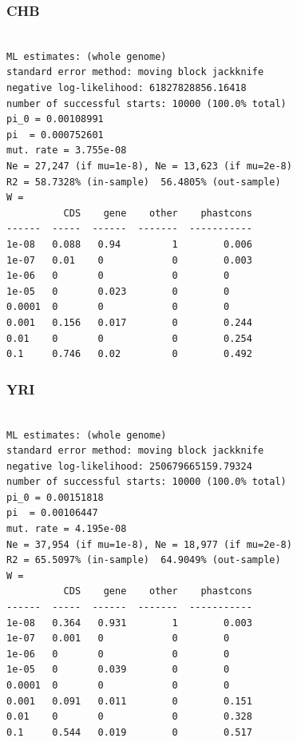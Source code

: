 \documentclass[11pt]{article}
\begin{document}
\subsubsection*{CHB}
\begin{minipage}{\linewidth}\begin{footnotesize}
\begin{verbatim}

ML estimates: (whole genome)
standard error method: moving block jackknife
negative log-likelihood: 61827828856.16418
number of successful starts: 10000 (100.0% total)
pi_0 = 0.00108991
pi  = 0.000752601
mut. rate = 3.755e-08 
Ne = 27,247 (if mu=1e-8), Ne = 13,623 (if mu=2e-8)
R2 = 58.7328% (in-sample)  56.4805% (out-sample)
W = 
          CDS    gene    other    phastcons
------  -----  ------  -------  -----------
1e-08   0.088   0.94         1        0.006
1e-07   0.01    0            0        0.003
1e-06   0       0            0        0
1e-05   0       0.023        0        0
0.0001  0       0            0        0
0.001   0.156   0.017        0        0.244
0.01    0       0            0        0.254
0.1     0.746   0.02         0        0.492
\end{verbatim}
\end{footnotesize}\end{minipage}


\subsubsection*{YRI}
\begin{minipage}{\linewidth}\begin{footnotesize}
\begin{verbatim}

ML estimates: (whole genome)
standard error method: moving block jackknife
negative log-likelihood: 250679665159.79324
number of successful starts: 10000 (100.0% total)
pi_0 = 0.00151818
pi  = 0.00106447
mut. rate = 4.195e-08 
Ne = 37,954 (if mu=1e-8), Ne = 18,977 (if mu=2e-8)
R2 = 65.5097% (in-sample)  64.9049% (out-sample)
W = 
          CDS    gene    other    phastcons
------  -----  ------  -------  -----------
1e-08   0.364   0.931        1        0.003
1e-07   0.001   0            0        0
1e-06   0       0            0        0
1e-05   0       0.039        0        0
0.0001  0       0            0        0
0.001   0.091   0.011        0        0.151
0.01    0       0            0        0.328
0.1     0.544   0.019        0        0.517
\end{verbatim}
\end{footnotesize}\end{minipage}
\end{document}

